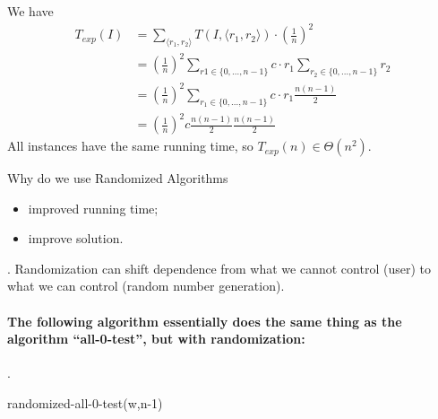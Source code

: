 \documentclass{article}
\begin{document}
\begin{solution}
    We have \begin{align*}
        T_{exp}(I)
        & = \sum_{\langle r_1, r_2 \rangle} T(I, \langle r_1, r_2 \rangle) \cdot \left( \frac{1}{n} \right)^2 \\ 
        & = \left( \frac{1}{n} \right)^2 \sum_{r1 \in \{0, \ldots, n-1\}} c \cdot r_1 \sum_{r_2 \in \{0, \ldots, n-1\}} r_2 \\ 
        & = \left( \frac{1}{n} \right)^2 \sum_{r_1 \in \{0, \ldots, n-1\}} c \cdot r_1 \frac{n (n-1)}{2} \\ 
        & = \left( \frac{1}{n} \right)^2 c \frac{n (n-1)}{2} \frac{n (n-1)}{2}
    \end{align*}
    All instances have the same running time, so $T_{exp}(n) \in \Theta(n^2)$. 
\end{solution}

\begin{Question}{Why do we use Randomized Algorithms}
    \begin{itemize}
        \item improved running time; 
        \item improve solution. 
    \end{itemize}
\end{Question}

\begin{result}[].
    Randomization can shift dependence from what we cannot control (user) to what we can control (random number generation). 
\end{result}

\paragraph{The following algorithm essentially does the same thing as the algorithm ``all-0-test'', but with randomization:} 
\begin{algo}[].
    \begin{algorithm}[H] 
        randomized-all-0-test(w,n-1)
        \caption{randomized-all-0-test}
    \end{algorithm}
\end{algo}
\end{document}
